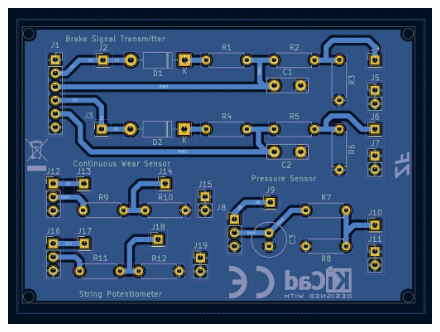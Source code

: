 \documentclass[8pt,compress]{beamer}
\begin{document}
\begin{frame}
  \hfill
  \begin{minipage}{0.45\textwidth}
    \begin{figure}
      \includegraphics[width=\textwidth]{assets/electronic/peri_pcb.jpg}
    \end{figure}
  \end{minipage}
\end{frame}
\end{document}
